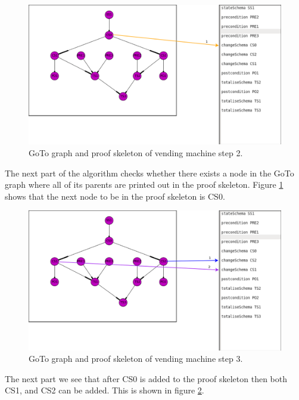 \begin{figure}[H]
\includegraphics[scale=0.3]{Figures/skeleton/2.png}
\caption{GoTo graph and proof skeleton of vending machine step 2.}
\label{fig:2}
\end{figure}

The next part of the algorithm checks whether there exists a node in the GoTo
graph where all of its parents are printed out in the proof skeleton. Figure
\ref{fig:2} shows that the next node to be in the proof skeleton is CS0. 

\begin{figure}[H]
\includegraphics[scale=0.3]{Figures/skeleton/3.png}
\caption{GoTo graph and proof skeleton of vending machine step 3.}
\label{fig:3}
\end{figure}

The next part we see that after CS0 is added to the proof skeleton then both
CS1, and CS2 can be added. This is shown in figure \ref{fig:3}.


